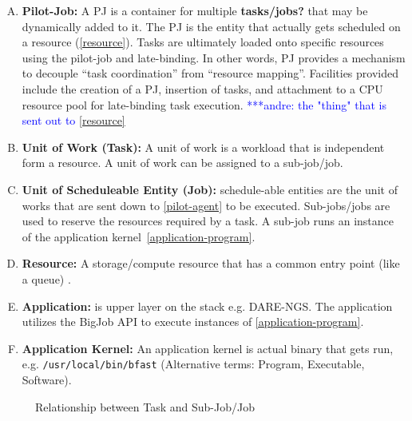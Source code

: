\documentclass[]{article}
\newcommand{\alnote}[1]{ {\textcolor{blue} { ***andre: #1 }}}
\newcommand{\alnote}[1]{}
\begin{document}
\begin{enumerate}[A.]
	\item\textbf{Pilot-Job:} A PJ is a container for multiple \textbf{tasks/jobs?} 
	that may be dynamically added to it. The PJ is the entity that actually gets 
	scheduled on a resource (\ref{resource}). Tasks are ultimately loaded onto 
	specific resources using the pilot-job and late-binding. In other words, PJ 
	provides a mechanism 
	to decouple “task coordination” from “resource mapping”. Facilities provided 
	include the creation of a PJ, insertion of tasks, and attachment to a CPU 
	resource pool for late-binding task execution. \alnote{ the "thing" that is 
	sent out to \ref{resource}} \label{pilot-agent}    	
	\item \textbf{Unit of Work (Task):} A unit of work is a workload that is 
	independent form a resource. A unit of work can be assigned to a 
	sub-job/job.
	\item \textbf{Unit of Scheduleable Entity (Job):} schedule-able entities are 
	the unit of works that are sent down to \ref{pilot-agent} to be executed. 
	Sub-jobs/jobs are used to reserve the resources required by a task. A 
	sub-job runs an instance of the application 
	kernel~\ref{application-program}. 	
	\item \textbf{Resource:} A storage/compute resource that has a common entry 
	point (like a queue) \label{resource}.
	\item \textbf{Application:} is upper layer on the stack e.g. DARE-NGS. The application utilizes the BigJob API to execute instances of \ref{application-program}. \label{application}
	\item \textbf{Application Kernel:} An application kernel is actual binary that gets run, e.g. \texttt{/usr/local/bin/bfast} (Alternative terms: Program, Executable, Software). \label{application-program}	
	
\end{enumerate}

\begin{figure}[htbp]
        \centering
    \qquad\qquad
    \caption{Relationship between Task and Sub-Job/Job}
    \label{fig:figures_task-job1}
\end{figure}    
\end{document}
